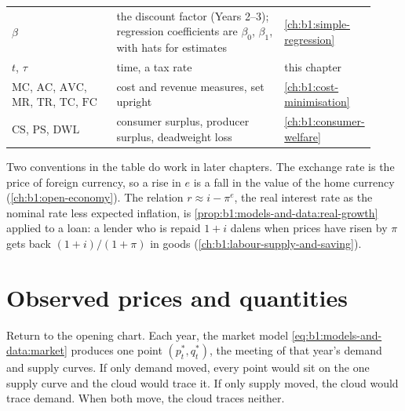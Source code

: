 \begin{table}[ht]
\begin{tabular}{@{}>{\raggedright\arraybackslash}p{0.30\linewidth}
                >{\raggedright\arraybackslash}p{0.48\linewidth}
                >{\raggedright\arraybackslash}p{0.14\linewidth}@{}}
$\beta$ & the discount factor (Years 2--3); regression coefficients are $\beta_0$, $\beta_1$, with hats for estimates & \cref{ch:b1:simple-regression} \\
$t$, $\tau$ & time, a tax rate & this chapter \\
$\mathrm{MC}$, $\mathrm{AC}$, $\mathrm{AVC}$, $\mathrm{MR}$, $\mathrm{TR}$, $\mathrm{TC}$, $\mathrm{FC}$ & cost and revenue measures, set upright & \cref{ch:b1:cost-minimisation} \\
$\mathrm{CS}$, $\mathrm{PS}$, $\mathrm{DWL}$ & consumer surplus, producer surplus, deadweight loss & \cref{ch:b1:consumer-welfare} \\
\bottomrule
\end{tabular}
\end{table}

Two conventions in the table do work in later chapters. The exchange rate
is the price of foreign currency, so a rise in $e$ is a fall in the value of
the home currency (\cref{ch:b1:open-economy}). The relation
$r \approx i - \pi^e$, the real interest rate as the nominal rate less
expected inflation, is \cref{prop:b1:models-and-data:real-growth} applied
to a loan: a lender who is repaid $1 + i$ dalens when prices have risen by
$\pi$ gets back $(1 + i)/(1 + \pi)$ in goods (\cref{ch:b1:labour-supply-and-saving}).

\section{Observed prices and quantities}\label{sec:b1:models-and-data:identification}

Return to the opening chart. Each year, the market model
\eqref{eq:b1:models-and-data:market} produces one point $(p^*_t, q^*_t)$,
the meeting of that year's demand and supply curves. If only demand moved,
every point would sit on the one supply curve and the cloud would trace it.
If only supply moved, the cloud would trace demand. When both move, the
cloud traces neither.

